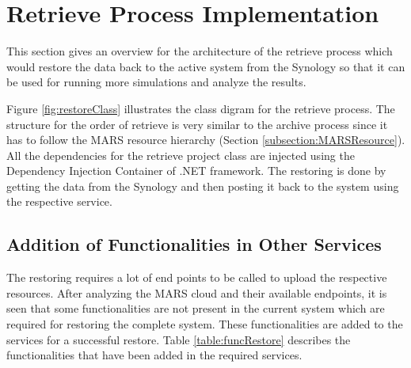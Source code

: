 \section{Retrieve Process Implementation}
This section gives an overview for the architecture of the retrieve process which would restore the data back to the active
system from the Synology so that it can be used for running more simulations and analyze the results. 

Figure \ref{fig:restoreClass} illustrates the class digram for the retrieve process. The structure for the order of retrieve is very similar to the archive process
since it has to follow the MARS resource hierarchy (Section \ref{subsection:MARSResource}). All the dependencies for the retrieve project class are injected
using the Dependency Injection Container of .NET framework. The restoring is done by getting the data from the Synology and then posting it back to the system
using the respective service.

\subsection{Addition of Functionalities in Other Services}
The restoring requires a lot of end points to be called to upload the respective resources. After analyzing the MARS cloud and their available endpoints, it is
seen that some functionalities are not present in the current system which are required for restoring the complete system. These functionalities are
added to the services for a successful restore. Table \ref{table:funcRestore} describes the functionalities that have been
added in the required services.

